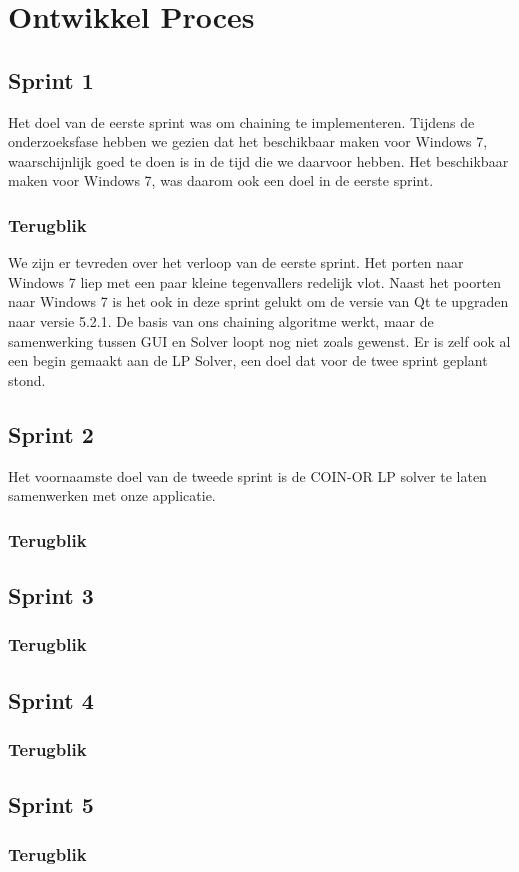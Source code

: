 \section{Ontwikkel Proces}

\subsection{Sprint 1}
Het doel van de eerste sprint was om chaining te implementeren. Tijdens de onderzoeksfase hebben we gezien dat het beschikbaar maken voor Windows 7, waarschijnlijk goed te doen is in de tijd die we daarvoor hebben. Het beschikbaar maken voor Windows 7, was daarom ook een doel in de eerste sprint. 

\subsubsection*{Terugblik}
We zijn er tevreden over het verloop van de eerste sprint. Het porten naar Windows 7 liep met een paar kleine tegenvallers redelijk vlot. Naast het poorten naar Windows 7 is het ook in deze sprint gelukt om de versie van Qt te upgraden naar versie 5.2.1. De basis van ons chaining algoritme werkt, maar de samenwerking tussen GUI en Solver loopt nog niet zoals gewenst. Er is zelf ook al een begin gemaakt aan de LP Solver, een doel dat voor de twee sprint geplant stond. 

\subsection{Sprint 2}
Het voornaamste doel van de tweede sprint is de COIN-OR LP solver te laten samenwerken met onze applicatie. 

\subsubsection*{Terugblik}

\subsection{Sprint 3}

\subsubsection*{Terugblik}

\subsection{Sprint 4}

\subsubsection*{Terugblik}

\subsection{Sprint 5}

\subsubsection*{Terugblik}

